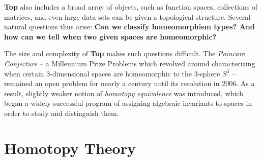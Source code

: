 \documentclass[a0,final]{a0poster}
\begin{document}
\begin{multicols}{3}
\begin{center}
\begin{tikzpicture}[scale=\textwidth/90cm,samples=200]
\end{tikzpicture}
\end{center}


\textbf{Top} also includes a broad array of objects, such as function spaces, collections of matrices, and even large data sets can be given a topological structure. Several natural questions thus arise: \textbf{Can we classify homeomorphism types? And how can we tell when two given spaces are homeomorphic?}

\columnbreak


The size and complexity of \textbf{Top} makes such questions difficult. The \textit{Poincare Conjecture} -- a Millennium Prize Problems which revolved around characterizing when certain 3-dimensional spaces are homeomorphic to the 3-sphere $S^3$ -- remained an open problem for nearly a century until its resolution in 2006. As a result, slightly weaker notion of \textit{homotopy equivalence} was introduced, which began a widely successful program of assigning algebraic invariants to spaces in order to study and distinguish them.

\section*{Homotopy Theory}


\end{multicols}
\end{document}
